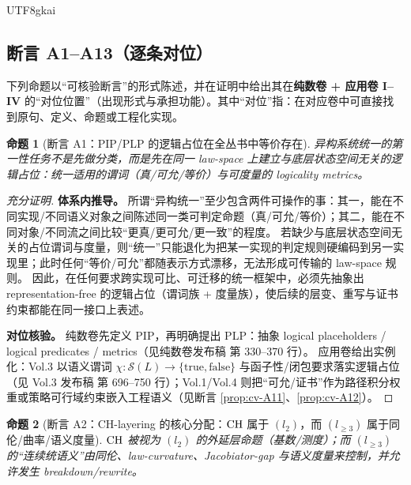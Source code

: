 \documentclass[12pt]{article}
\newtheorem{proposition}{命题}[section]
\begin{document}
\begin{CJK*}{UTF8}{gkai}
\subsection{断言 A1--A13（逐条对位）}

下列命题以“可核验断言”的形式陈述，并在证明中给出其在\textbf{纯数卷 + 应用卷 I--IV} 的“对位位置”（出现形式与承担功能）。其中“对位”指：在对应卷中可直接找到原句、定义、命题或工程化实现。

\begin{proposition}[断言 A1：PIP/PLP 的逻辑占位在全丛书中等价存在]\label{prop:cv-A1}
异构系统统一的第一性任务不是先做分类，而是先在同一 law-space 上建立与底层状态空间无关的\emph{逻辑占位}：统一适用的谓词（真/可允/等价）与可度量的 logicality metrics。
\end{proposition}

\begin{proof}[充分证明]
\textbf{体系内推导。}
所谓“异构统一”至少包含两件可操作的事：其一，能在不同实现/不同语义对象之间陈述同一类可判定命题（真/可允/等价）；其二，能在不同对象/不同流之间比较“更真/更可允/更一致”的程度。
若缺少与底层状态空间无关的占位谓词与度量，则“统一”只能退化为把某一实现的判定规则硬编码到另一实现里；此时任何“等价/可允”都随表示方式漂移，无法形成可传输的 law-space 规则。
因此，在任何要求跨实现可比、可迁移的统一框架中，必须先抽象出 representation-free 的逻辑占位（谓词族 + 度量族），使后续的层变、重写与证书约束都能在同一接口上表述。

\textbf{对位核验。}
纯数卷先定义 PIP，再明确提出 PLP：抽象 logical placeholders / logical predicates / metrics（见纯数卷发布稿\cite{GaoZheng2025GFramework} 第
  330--370 行）。
应用卷给出实例化：Vol.3 以语义谓词 $\chi:\mathcal S(L)\to\{\mathrm{true},\mathrm{false}\}$ 与函子性/闭包要求落实逻辑占位（见 Vol.3
  发布稿\cite{GaoZhengAppVol3} 第 696--750 行）；Vol.1/Vol.4 则把“可允/证书”作为路径积分权重或策略可行域约束嵌入工程语义（见断言 \ref{prop:cv-A11}、\ref{prop:cv-A12}）。
\end{proof}

\begin{proposition}[断言 A2：CH-layering 的核心分配：$\mathrm{CH}$ 属于 $(l_2)$，而 $(l_{\ge3})$ 属于同伦/曲率/语义度量]\label{prop:cv-A2}
$\mathrm{CH}$ 被视为 $(l_2)$ 的外延层命题（基数/测度）；而 $(l_{\ge3})$ 的“连续统语义”由同伦、law-curvature、Jacobiator-gap 与语义度量来控制，并允许发生
  breakdown/rewrite。
\end{proposition}


\end{CJK*}
\end{document}
